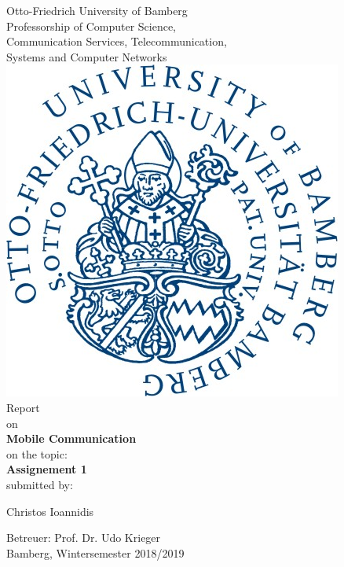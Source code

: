 \documentclass[10pt,a4paper]{article}
\author{Christos Ioannidis}
\begin{document}
\begin{titlepage}
		\begin{center}
		\small Otto-Friedrich University of Bamberg\\
		\vspace{5mm}
		\LARGE Professorship of Computer Science,\\
		Communication Services, Telecommunication,\\
		Systems and Computer Networks\\
		\vspace{8mm}
		\includegraphics[scale=0.15]{images/uniBaLogo.png}\\
		\vspace{10mm}
		\LARGE Report\\
		\vspace{2mm}
		\small on\\
		\vspace{5mm}
		\LARGE \textbf{Mobile Communication}\\
		\vspace{15mm}
		\normalsize on the topic:\\
		\vspace{5mm}
		\huge \textbf{Assignement 1} \\
		\vspace{5mm}
		\small submitted by:\\
		\vspace{5mm}
		
		Christos Ioannidis\\
		\vspace{10mm}
		
		\small Betreuer: Prof. Dr. Udo Krieger\\
		\vspace{2mm}
		Bamberg, Wintersemester 2018/2019
		
	\end{center}
\end{titlepage}
\end{document}
